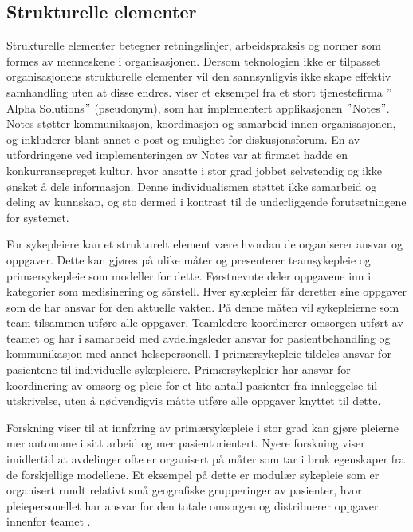 \subsection{Strukturelle elementer}
\label{sec:strukturelle_elementer}
Strukturelle elementer betegner retningslinjer, arbeidspraksis og normer som formes av menneskene i organisasjonen. Dersom teknologien ikke er tilpasset organisasjonens strukturelle elementer vil den sannsynligvis ikke skape effektiv samhandling uten at disse endres. \citet{Orlikowski92} viser et eksempel fra et stort tjenestefirma $"$Alpha Solutions$"$ (pseudonym), som har implementert applikasjonen $"$Notes$"$. Notes støtter kommunikasjon, koordinasjon og samarbeid innen organisasjonen, og inkluderer blant annet e-post og mulighet for diskusjonsforum. En av utfordringene ved implementeringen av Notes var at firmaet hadde en konkurransepreget kultur, hvor ansatte i stor grad jobbet selvstendig og ikke ønsket å dele informasjon. Denne individualismen støttet ikke samarbeid og deling av kunnskap, og sto dermed i kontrast til de underliggende forutsetningene for systemet. 

\noindent
For sykepleiere kan et strukturelt element være hvordan de organiserer ansvar og oppgaver. Dette kan gjøres på ulike måter og \citet{Rygh13} presenterer teamsykepleie og primærsykepleie som modeller for dette. Førstnevnte deler oppgavene inn i kategorier som medisinering og sårstell. Hver sykepleier får deretter sine oppgaver som de har ansvar for den aktuelle vakten. På denne måten vil sykepleierne som team tilsammen utføre alle oppgaver. Teamledere koordinerer omsorgen utført av teamet og har i samarbeid med avdelingsleder ansvar for pasientbehandling og kommunikasjon med annet helsepersonell. I primærsykepleie tildeles ansvar for pasientene til individuelle sykepleiere. Primærsykepleier har ansvar for koordinering av omsorg og pleie for et lite antall pasienter fra innleggelse til utskrivelse, uten å nødvendigvis måtte utføre alle oppgaver knyttet til dette. 

\noindent
Forskning viser til at innføring av primærsykepleie i stor grad kan gjøre pleierne mer autonome i sitt arbeid og mer pasientorientert. Nyere forskning viser imidlertid at avdelinger ofte er organisert på måter som tar i bruk egenskaper fra de forskjellige modellene. Et eksempel på dette er modulær sykepleie som er organisert rundt relativt små geografiske grupperinger av pasienter, hvor pleiepersonellet har ansvar for den totale omsorgen og distribuerer oppgaver innenfor teamet \citep{Rygh13}.

